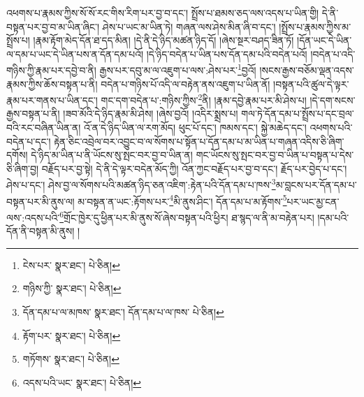 འཕགས་པ་རྣམས་ཀྱིས་སོ་སོ་རང་གིས་རིག་པར་བྱ་བ་དང་། སྤྲོས་པ་ཐམས་ཅད་ལས་འདས་པ་ཡིན་གྱི། དེ་ནི་བསྟན་པར་བྱ་བ་མ་ཡིན་ཞིང་། ཤེས་པ་ཡང་མ་ཡིན་ཏེ། གཞན་ལས་ཤེས་མིན་ཞི་བ་དང་། །སྤྲོས་པ་རྣམས་ཀྱིས་མ་སྤྲོས་པ། །རྣམ་རྟོག་མེད་དོན་ཐ་དད་མིན། །དེ་ནི་དེ་ཉིད་མཚན་ཉིད་དོ། །ཞེས་སྔར་བཤད་ཟིན་ཏོ། །དོན་ཡང་དེ་ཡིན་ལ་དམ་པ་ཡང་དེ་ཡིན་པས་ན་དོན་དམ་པའོ། །དེ་ཉིད་བདེན་པ་ཡིན་པས་དོན་དམ་པའི་བདེན་པའོ། །བདེན་པ་འདི་གཉིས་ཀྱི་རྣམ་པར་དབྱེ་བ་ནི། རྒྱས་པར་དབུ་མ་ལ་འཇུག་པ་ལས་:ཤེས་པར་\footnote{ངེས་པར་  སྣར་ཐང་།  པེ་ཅིན། }བྱའོ། །སངས་རྒྱས་བཅོམ་ལྡན་འདས་རྣམས་ཀྱིས་ཆོས་བསྟན་པ་ནི། བདེན་པ་གཉིས་པོ་འདི་ལ་བརྟེན་ནས་འཇུག་པ་ཡིན་ནོ། །བསྟན་པའི་ཚུལ་དེ་ལྟར་རྣམ་པར་གནས་པ་ཡིན་དང་། གང་དག་བདེན་པ་:གཉིས་ཀྱིས་\footnote{གཉིས་ཀྱི་  སྣར་ཐང་།  པེ་ཅིན། }ནི། །རྣམ་དབྱེ་རྣམ་པར་མི་ཤེས་པ། །དེ་དག་སངས་རྒྱས་བསྟན་པ་ནི། །ཟབ་མོའི་དེ་ཉིད་རྣམ་མི་ཤེས། །ཞེས་བྱའོ། །འདིར་སྨྲས་པ། གལ་ཏེ་དོན་དམ་པ་སྤྲོས་པ་དང་བྲལ་བའི་རང་བཞིན་ཡིན་ན། འོ་ན་དེ་ཉིད་ཡིན་ལ་རག་མོད། ཕུང་པོ་དང་། ཁམས་དང་། སྐྱེ་མཆེད་དང་། འཕགས་པའི་བདེན་པ་དང་། རྟེན་ཅིང་འབྲེལ་བར་འབྱུང་བ་ལ་སོགས་པ་སྟོན་པ་དོན་དམ་པ་མ་ཡིན་པ་གཞན་འདིས་ཅི་ཞིག་དགོས། དེ་ཉིད་མ་ཡིན་པ་ནི་ཡོངས་སུ་སྤང་བར་བྱ་བ་ཡིན་ན། གང་ཡོངས་སུ་སྤང་བར་བྱ་བ་ཡིན་པ་བསྟན་པ་དེས་ཅི་ཞིག་བྱ། བརྗོད་པར་བྱ་སྟེ། དེ་ནི་དེ་ལྟར་བདེན་མོད་ཀྱི། འོན་ཀྱང་བརྗོད་པར་བྱ་བ་དང་། རྗོད་པར་བྱེད་པ་དང་། ཤེས་པ་དང་། ཤེས་བྱ་ལ་སོགས་པའི་མཚན་ཉིད་ཅན་འཇིག་:རྟེན་པའི་དོན་དམ་པ་ཁས་\footnote{དོན་དམ་པ་ལ་མཁས་  སྣར་ཐང་། དོན་དམ་པ་ལ་ཁས་  པེ་ཅིན། }མ་བླངས་པར་དོན་དམ་པ་བསྟན་པར་མི་ནུས་ལ། མ་བསྟན་ན་ཡང་:རྟོགས་པར་\footnote{རྟོག་པར་  སྣར་ཐང་།  པེ་ཅིན། }མི་ནུས་ཤིང་། དོན་དམ་པ་མ་རྟོགས་\footnote{གཏོགས་  སྣར་ཐང་།  པེ་ཅིན། }པར་ཡང་མྱ་ངན་ལས་:འདས་པའི་\footnote{འདས་པའི་ཡང་  སྣར་ཐང་།  པེ་ཅིན། }གྲོང་ཁྱེར་དུ་ཕྱིན་པར་མི་ནུས་སོ་ཞེས་བསྟན་པའི་ཕྱིར། ཐ་སྙད་ལ་ནི་མ་བརྟེན་པར། །དམ་པའི་དོན་ནི་བསྟན་མི་ནུས། །
